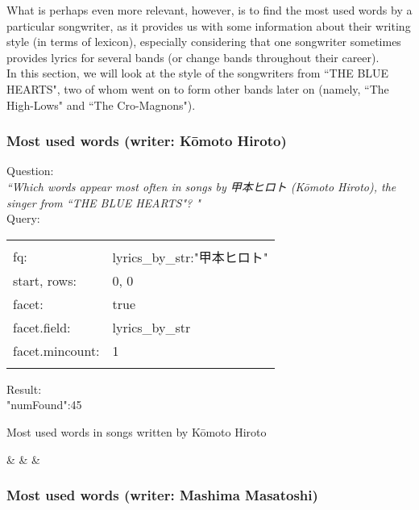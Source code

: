 What is perhaps even more relevant, however, is to find the most used words by a particular songwriter, as it provides us with some information about their writing style (in terms of lexicon), especially considering that one songwriter sometimes provides lyrics for several bands (or change bands throughout their career). \\

In this section, we will look at the style of the songwriters from ``THE BLUE HEARTS", two of whom went on to form other bands later on (namely, ``The High-Lows" and ``The Cro-Magnons"). \\


\subsubsection{Most used words (writer: Kōmoto Hiroto)}

Question: \\
\emph{``Which words appear most often in songs by 甲本ヒロト (Kōmoto Hiroto), the singer from ``THE BLUE HEARTS"? "} \\

Query:

\begin{tabular}{| l |  l |}
	\hline
	& \\
	fq: & lyrics\_by\_str:"甲本ヒロト" \\
	start, rows: & 0, 0 \\
	facet: & true \\
	facet.field: & lyrics\_by\_str \\
	facet.mincount: & 1 \\
	& \\
	\hline
\end{tabular}


\bigskip
Result: \\

"numFound":45

\begin{myLongTable}{Most used words in songs written by Kōmoto Hiroto}
	
	& & & \\
\end{myLongTable}




\bigskip
\subsubsection{Most used words (writer: Mashima Masatoshi)}


